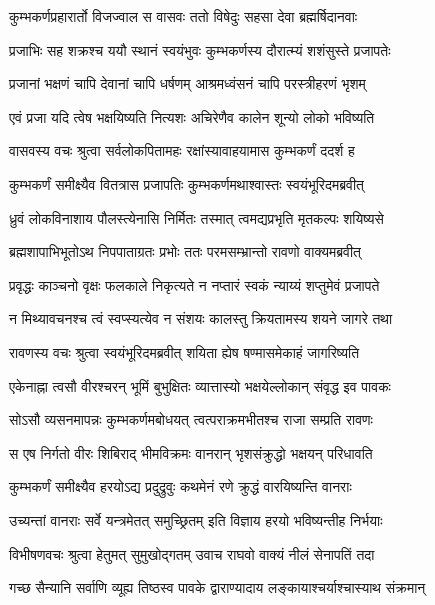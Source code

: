 \twolineshloka
{कुम्भकर्णप्रहारार्तो विजज्वाल स वासवः}
{ततो विषेदुः सहसा देवा ब्रह्मर्षिदानवाः} %

\twolineshloka
{प्रजाभिः सह शक्रश्च ययौ स्थानं स्वयंभुवः}
{कुम्भकर्णस्य दौरात्म्यं शशंसुस्ते प्रजापतेः} %

\twolineshloka
{प्रजानां भक्षणं चापि देवानां चापि धर्षणम्}
{आश्रमध्वंसनं चापि परस्त्रीहरणं भृशम्} %

\twolineshloka
{एवं प्रजा यदि त्वेष भक्षयिष्यति नित्यशः}
{अचिरेणैव कालेन शून्यो लोको भविष्यति} %

\twolineshloka
{वासवस्य वचः श्रुत्वा सर्वलोकपितामहः}
{रक्षांस्यावाहयामास कुम्भकर्णं ददर्श ह} %

\twolineshloka
{कुम्भकर्णं समीक्ष्यैव वितत्रास प्रजापतिः}
{कुम्भकर्णमथाश्वास्तः स्वयंभूरिदमब्रवीत्} %

\twolineshloka
{ध्रुवं लोकविनाशाय पौलस्त्येनासि निर्मितः}
{तस्मात् त्वमद्यप्रभृति मृतकल्पः शयिष्यसे} %

\twolineshloka
{ब्रह्मशापाभिभूतोऽथ निपपाताग्रतः प्रभोः}
{ततः परमसम्भ्रान्तो रावणो वाक्यमब्रवीत्} %

\twolineshloka
{प्रवृद्धः काञ्चनो वृक्षः फलकाले निकृत्यते}
{न नप्तारं स्वकं न्याय्यं शप्तुमेवं प्रजापते} %

\twolineshloka
{न मिथ्यावचनश्च त्वं स्वप्स्यत्येव न संशयः}
{कालस्तु क्रियतामस्य शयने जागरे तथा} %

\twolineshloka
{रावणस्य वचः श्रुत्वा स्वयंभूरिदमब्रवीत्}
{शयिता ह्येष षण्मासमेकाहं जागरिष्यति} %

\twolineshloka
{एकेनाह्ना त्वसौ वीरश्चरन् भूमिं बुभुक्षितः}
{व्यात्तास्यो भक्षयेल्लोकान् संवृद्ध इव पावकः} %

\twolineshloka
{सोऽसौ व्यसनमापन्नः कुम्भकर्णमबोधयत्}
{त्वत्पराक्रमभीतश्च राजा सम्प्रति रावणः} %

\twolineshloka
{स एष निर्गतो वीरः शिबिराद् भीमविक्रमः}
{वानरान् भृशसंक्रुद्धो भक्षयन् परिधावति} %

\twolineshloka
{कुम्भकर्णं समीक्ष्यैव हरयोऽद्य प्रदुद्रुवुः}
{कथमेनं रणे क्रुद्धं वारयिष्यन्ति वानराः} %

\twolineshloka
{उच्यन्तां वानराः सर्वे यन्त्रमेतत् समुच्छ्रितम्}
{इति विज्ञाय हरयो भविष्यन्तीह निर्भयाः} %

\twolineshloka
{विभीषणवचः श्रुत्वा हेतुमत् सुमुखोद्गतम्}
{उवाच राघवो वाक्यं नीलं सेनापतिं तदा} %

\twolineshloka
{गच्छ सैन्यानि सर्वाणि व्यूह्य तिष्ठस्व पावके}
{द्वाराण्यादाय लङ्कायाश्चर्याश्चास्याथ संक्रमान्} %

